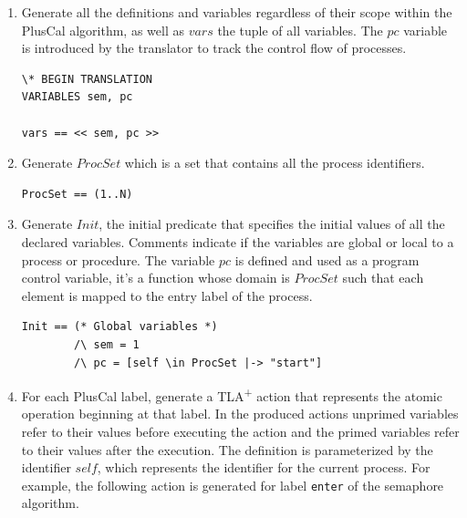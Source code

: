 \documentclass{thesul}
\newcommand{\tlaplus}{TLA\textsuperscript{+}\xspace}
\begin{document}
\begin{enumerate}
\item Generate all the definitions and variables regardless of their scope within the PlusCal algorithm, as well as $vars$ the tuple of all variables.
The $pc$ variable is introduced by the translator to track the control flow of processes.

\FloatBarrier
\begin{lstlisting}[frame = tlrb, firstnumber = 1,xleftmargin=.2\textwidth, xrightmargin=.2\textwidth]
\* BEGIN TRANSLATION
VARIABLES sem, pc

vars == << sem, pc >>

\end{lstlisting}

\item Generate $ProcSet$ which is a set that contains all the process identifiers.

\begin{lstlisting}[frame = tlrb, firstnumber = 1,xleftmargin=.2\textwidth, xrightmargin=.2\textwidth]
ProcSet == (1..N)

\end{lstlisting}

\item  Generate $Init$, the initial predicate that specifies the initial values of all the declared variables. Comments indicate if the variables are global or local to a process or procedure.
The variable $pc$ is defined and used as a program control variable, it's a function whose domain is $ProcSet$ such that each element is mapped to the entry label of the process.

\begin{lstlisting}[frame = tlrb, firstnumber = 1, xleftmargin=.2\textwidth, xrightmargin=.2\textwidth]
Init == (* Global variables *)
        /\ sem = 1
        /\ pc = [self \in ProcSet |-> "start"]

\end{lstlisting}

\item For each PlusCal label, generate a \tlaplus action that represents the atomic operation beginning at that label. 
In the produced actions unprimed variables refer to their values before executing the action and the primed variables refer to their values after the execution.
The definition is parameterized by the identifier $self$,
which represents the identifier for the current process. For example, the following action is generated for label \texttt{enter} of the semaphore algorithm.


\end{enumerate}
\end{document}
